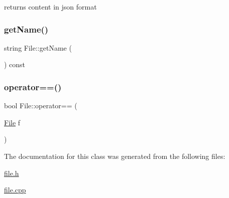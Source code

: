 returns content in json format 

\mbox{\label{class_file_a4b6032847dfd076db8ed44a532387f07}} 
\subsubsection{\texorpdfstring{get\+Name()}{getName()}}
{\footnotesize\ttfamily string File\+::get\+Name (\begin{DoxyParamCaption}{ }\end{DoxyParamCaption}) const\hspace{0.3cm}{\ttfamily [inline]}}

\mbox{\label{class_file_aadbe64432e7e403f546ff35a3bfa8d97}} 
\subsubsection{\texorpdfstring{operator==()}{operator==()}}
{\footnotesize\ttfamily bool File\+::operator== (\begin{DoxyParamCaption}\item[{\hyperlink{class_file}{File}}]{f }\end{DoxyParamCaption})\hspace{0.3cm}{\ttfamily [inline]}}



The documentation for this class was generated from the following files\+:\begin{DoxyCompactItemize}
\item 
\hyperlink{file_8h}{file.\+h}\item 
\hyperlink{file_8cpp}{file.\+cpp}\end{DoxyCompactItemize}
